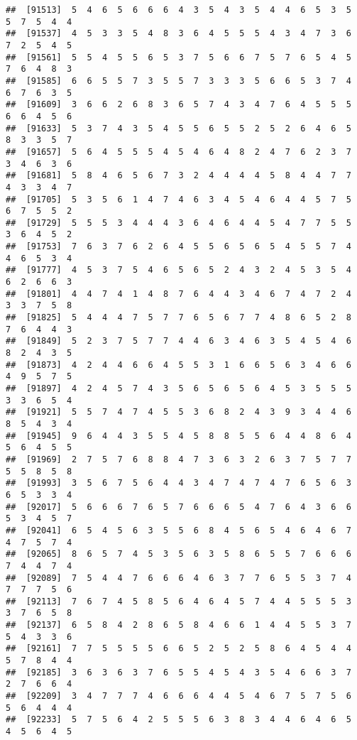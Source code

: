\documentclass[
]{book}
\begin{document}
\begin{verbatim}
##  [91513]  5  4  6  5  6  6  6  4  3  5  4  3  5  4  4  6  5  3  5  5  7  5  4  4
##  [91537]  4  5  3  3  5  4  8  3  6  4  5  5  5  4  3  4  7  3  6  7  2  5  4  5
##  [91561]  5  5  4  5  5  6  5  3  7  5  6  6  7  5  7  6  5  4  5  7  6  4  8  3
##  [91585]  6  6  5  5  7  3  5  5  7  3  3  3  5  6  6  5  3  7  4  6  7  6  3  5
##  [91609]  3  6  6  2  6  8  3  6  5  7  4  3  4  7  6  4  5  5  5  6  6  4  5  6
##  [91633]  5  3  7  4  3  5  4  5  5  6  5  5  2  5  2  6  4  6  5  8  3  3  5  7
##  [91657]  5  6  4  5  5  5  4  5  4  6  4  8  2  4  7  6  2  3  7  3  4  6  3  6
##  [91681]  5  8  4  6  5  6  7  3  2  4  4  4  4  5  8  4  4  7  7  4  3  3  4  7
##  [91705]  5  3  5  6  1  4  7  4  6  3  4  5  4  6  4  4  5  7  5  6  7  5  5  2
##  [91729]  5  5  5  3  4  4  4  3  6  4  6  4  4  5  4  7  7  5  5  3  6  4  5  2
##  [91753]  7  6  3  7  6  2  6  4  5  5  6  5  6  5  4  5  5  7  4  4  6  5  3  4
##  [91777]  4  5  3  7  5  4  6  5  6  5  2  4  3  2  4  5  3  5  4  6  2  6  6  3
##  [91801]  4  4  7  4  1  4  8  7  6  4  4  3  4  6  7  4  7  2  4  3  3  7  5  8
##  [91825]  5  4  4  4  7  5  7  7  6  5  6  7  7  4  8  6  5  2  8  7  6  4  4  3
##  [91849]  5  2  3  7  5  7  7  4  4  6  3  4  6  3  5  4  5  4  6  8  2  4  3  5
##  [91873]  4  2  4  4  6  6  4  5  5  3  1  6  6  5  6  3  4  6  6  4  9  5  7  5
##  [91897]  4  2  4  5  7  4  3  5  6  5  6  5  6  4  5  3  5  5  5  3  3  6  5  4
##  [91921]  5  5  7  4  7  4  5  5  3  6  8  2  4  3  9  3  4  4  6  8  5  4  3  4
##  [91945]  9  6  4  4  3  5  5  4  5  8  8  5  5  6  4  4  8  6  4  5  6  4  5  5
##  [91969]  2  7  5  7  6  8  8  4  7  3  6  3  2  6  3  7  5  7  7  5  5  8  5  8
##  [91993]  3  5  6  7  5  6  4  4  3  4  7  4  7  4  7  6  5  6  3  6  5  3  3  4
##  [92017]  5  6  6  6  7  6  5  7  6  6  6  5  4  7  6  4  3  6  6  5  3  4  5  7
##  [92041]  6  5  4  5  6  3  5  5  6  8  4  5  6  5  4  6  4  6  7  4  7  5  7  4
##  [92065]  8  6  5  7  4  5  3  5  6  3  5  8  6  5  5  7  6  6  6  7  4  4  7  4
##  [92089]  7  5  4  4  7  6  6  6  4  6  3  7  7  6  5  5  3  7  4  7  7  7  5  6
##  [92113]  7  6  7  4  5  8  5  6  4  6  4  5  7  4  4  5  5  5  3  3  7  6  5  8
##  [92137]  6  5  8  4  2  8  6  5  8  4  6  6  1  4  4  5  5  3  7  5  4  3  3  6
##  [92161]  7  7  5  5  5  5  6  6  5  2  5  2  5  8  6  4  5  4  4  5  7  8  4  4
##  [92185]  3  6  3  6  3  7  6  5  5  4  5  4  3  5  4  6  6  3  7  2  7  6  6  4
##  [92209]  3  4  7  7  7  4  6  6  6  4  4  5  4  6  7  5  7  5  6  5  6  4  4  4
##  [92233]  5  7  5  6  4  2  5  5  5  6  3  8  3  4  4  6  4  6  5  4  5  6  4  5

\end{verbatim}
\end{document}
